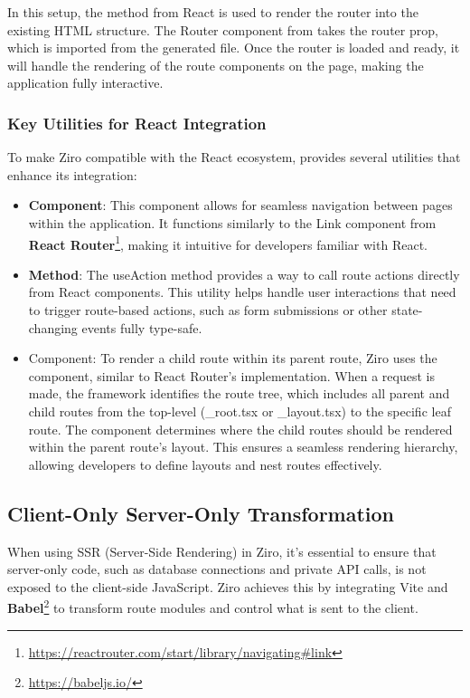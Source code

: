 In this setup, the  method from React is used to render the router into the existing HTML structure. The Router component from  takes the router prop, which is imported from the generated  file. Once the router is loaded and ready, it will handle the rendering of the route components on the page, making the application fully interactive.

\subsubsection{Key Utilities for React Integration}
To make Ziro compatible with the React ecosystem,  provides several utilities that enhance its integration:
\begin{itemize}
  \item \textbf{ Component}: This component allows for seamless navigation between pages within the application. It functions similarly to the Link component from \textbf{React Router}\footnote{\url{https://reactrouter.com/start/library/navigating\#link}}, making it intuitive for developers familiar with React.
  \item \textbf{ Method}: The useAction method provides a way to call route actions directly from React components. This utility helps handle user interactions that need to trigger route-based actions, such as form submissions or other state-changing events fully type-safe.
  \item {} Component: To render a child route within its parent route, Ziro uses the  component, similar to React Router's implementation. When a request is made, the framework identifies the route tree, which includes all parent and child routes from the top-level (\_root.tsx or \_layout.tsx) to the specific leaf route. The  component determines where the child routes should be rendered within the parent route’s layout. This ensures a seamless rendering hierarchy, allowing developers to define layouts and nest routes effectively.
\end{itemize}

\subsection{Client-Only Server-Only Transformation}

When using SSR (Server-Side Rendering) in Ziro, it's essential to ensure that server-only code, such as database connections and private API calls, is not exposed to the client-side JavaScript. Ziro achieves this by integrating Vite and \textbf{Babel}\footnote{\url{https://babeljs.io/}} to transform route modules and control what is sent to the client.

